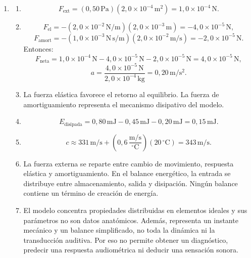 \begin{enumerate}[label=\textbf{I\arabic*.},leftmargin=*]
    \item
    \begin{enumerate}[label=\alph*)]
        \item
        \[
            F_\mathrm{ext}
            =(0{,}50\,\text{Pa})(2{,}0\times10^{-4}\,\text{m}^{2})
            =1{,}0\times10^{-4}\,\text{N}.
        \]

        \item
        \[
            F_\mathrm{el}
            =-(2{,}0\times10^{-2}\,\text{N}/\text{m})
            (2{,}0\times10^{-3}\,\text{m})
            =-4{,}0\times10^{-5}\,\text{N},
        \]
        \[
            F_\mathrm{amort}
            =-(1{,}0\times10^{-3}\,\text{N}\,\text{s}/\text{m})
            (2{,}0\times10^{-2}\,\text{m}/\text{s})
            =-2{,}0\times10^{-5}\,\text{N}.
        \]
        Entonces:
        \[
            F_\mathrm{neta}
            =1{,}0\times10^{-4}\,\text{N}
            -4{,}0\times10^{-5}\,\text{N}
            -2{,}0\times10^{-5}\,\text{N}
            =4{,}0\times10^{-5}\,\text{N},
        \]
        \[
            a=\frac{4{,}0\times10^{-5}\,\text{N}}
            {2{,}0\times10^{-4}\,\text{kg}}
            =0{,}20\,\text{m}/\text{s}^{2}.
        \]

        \item La fuerza elástica favorece el retorno al equilibrio. La fuerza
        de amortiguamiento representa el mecanismo disipativo del modelo.

        \item
        \[
            E_\mathrm{disipada}
            =0{,}80\,\text{mJ}-0{,}45\,\text{mJ}-0{,}20\,\text{mJ}
            =0{,}15\,\text{mJ}.
        \]

        \item
        \[
            c
            \approx331\,\text{m}/\text{s}
            +\left(0{,}6\,\frac{\text{m}/\text{s}}{^{\circ}\text{C}}\right)
            (20\,^{\circ}\text{C})
            =343\,\text{m}/\text{s}.
        \]

        \item La fuerza externa se reparte entre cambio de movimiento,
        respuesta elástica y amortiguamiento. En el balance energético, la
        entrada se distribuye entre almacenamiento, salida y disipación. Ningún
        balance contiene un término de creación de energía.

        \item El modelo concentra propiedades distribuidas en elementos
        ideales y sus parámetros no son datos anatómicos. Además, representa un
        instante mecánico y un balance simplificado, no toda la dinámica ni la
        transducción auditiva. Por eso no permite obtener un diagnóstico,
        predecir una respuesta audiométrica ni deducir una sensación sonora.
    \end{enumerate}
\end{enumerate}


